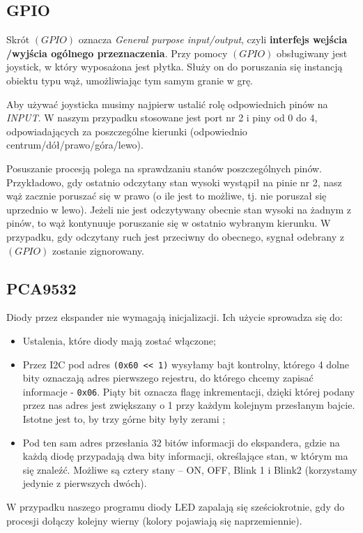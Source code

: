\documentclass[a4paper,12pt,twoside]{article}
\theoremstyle{plain}
\theoremstyle{definition}
\theoremstyle{remark}
\begin{document}
\subsection{GPIO}
Skrót $(GPIO)$ oznacza \textit{General purpose input/output}, czyli \textbf{interfejs wejścia /wyjścia ogólnego przeznaczenia}. Przy pomocy $(GPIO)$ obsługiwany jest joystick, w który wyposażona jest płytka. Służy on do poruszania się instancją obiektu typu wąż, umożliwiając tym samym granie w grę.

Aby używać joysticka musimy najpierw ustalić rolę odpowiednich pinów na \textit{INPUT}. W naszym przypadku stosowane jest port nr 2 i piny od $0$ do $4$, odpowiadających za poszczególne kierunki (odpowiednio centrum/dół/prawo/góra/lewo). 

Posuszanie procesją polega na sprawdzaniu stanów poszczególnych pinów. Przykładowo, gdy ostatnio odczytany stan wysoki wystąpił na pinie nr 2, nasz wąż zacznie poruszać się w prawo (o ile jest to możliwe, tj. nie poruszał się uprzednio w lewo). Jeżeli nie jest odczytywany obecnie stan wysoki na żadnym z pinów, to wąż kontynuuje poruszanie się w ostatnio wybranym kierunku. W przypadku, gdy odczytany ruch jest przeciwny do obecnego, sygnał odebrany z $(GPIO)$ zostanie zignorowany.




\subsection{PCA9532}
Diody przez ekspander nie wymagają inicjalizacji. 
Ich użycie sprowadza się do:
	\begin{itemize}
		\item Ustalenia, które diody mają zostać włączone;
		\item Przez I2C pod adres \verb|(0x60 << 1)| wysyłamy bajt kontrolny, którego 4 dolne bity oznaczają adres pierwszego rejestru, do którego chcemy zapisać informacje - \verb|0x06|. Piąty bit oznacza flagę inkrementacji, dzięki której podany przez nas adres jest zwiększany o 1 przy każdym kolejnym przesłanym bajcie. Istotne jest to, by trzy górne bity były zerami \cite{PCA};
		\item Pod ten sam adres przesłania 32 bitów informacji do ekspandera, gdzie na każdą diodę przypadają dwa bity informacji, określające stan, w którym ma się znaleźć. Możliwe są cztery stany \cite{PCA} -- ON, OFF, Blink 1 i Blink2 (korzystamy jedynie z pierwszych dwóch).
	\end{itemize}
W przypadku naszego programu diody LED zapalają się sześciokrotnie, gdy do procesji dołączy kolejny wierny (kolory pojawiają się naprzemiennie). 
\end{document}
